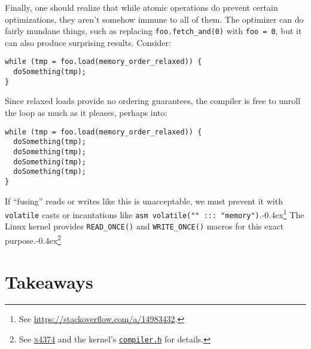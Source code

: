\documentclass[fontsize=\bodyfontsize, numbers=endperiod]{scrartcl}
\newcommand{\codesize}{\fontsize{\bodyfontsize}{\bodybaselineskip}}
\newcommand{\punckern}{\kern-0.4ex}
\newcommand{\monobox}[1]{\mbox{\texttt{#1}}}
\newenvironment{colfigure}
  {\par\vspace{1\baselineskip minus 0.5\baselineskip}\noindent\minipage{\linewidth}}
  {\endminipage\vspace{1\baselineskip minus 0.7\baselineskip}}
\begin{document}
\begin{multicols}{2}
Finally, one should realize that while atomic operations do prevent certain
optimizations, they aren't somehow immune to all of them.
The optimizer can do fairly mundane things, such as replacing
\monobox{foo.fetch\_and(0)} with \monobox{foo = 0},
but it can also produce surprising results.
Consider:
\begin{colfigure}
\begin{verbatim}
while (tmp = foo.load(memory_order_relaxed)) {
  doSomething(tmp);
}
\end{verbatim}
\end{colfigure}
Since relaxed loads provide no ordering guarantees,
the compiler is free to unroll the loop as much as it pleases,
perhaps into:
\begin{colfigure}
\begin{verbatim}
while (tmp = foo.load(memory_order_relaxed)) {
  doSomething(tmp);
  doSomething(tmp);
  doSomething(tmp);
  doSomething(tmp);
}
\end{verbatim}
\end{colfigure}
If ``fusing'' reads or writes like this is unacceptable,
we must prevent it
with \texttt{volatile} casts or incantations like
\texttt{asm volatile("" ::: "memory")}.\punckern\footnote{See
\url{https://stackoverflow.com/a/14983432}.}
The Linux kernel provides \monobox{READ\_ONCE()} and \monobox{WRITE\_ONCE()}
macros for this exact purpose.\punckern\footnote{See
\href{http://www.open-std.org/jtc1/sc22/wg21/docs/papers/2015/n4374.html}{\textsc{n}4374}
and the kernel's
\href{http://elixir.free-electrons.com/linux/latest/source/include/linux/compiler.h}{\texttt{compiler.h}}
for details.}

\section{Takeaways}


\end{multicols}
\end{document}
